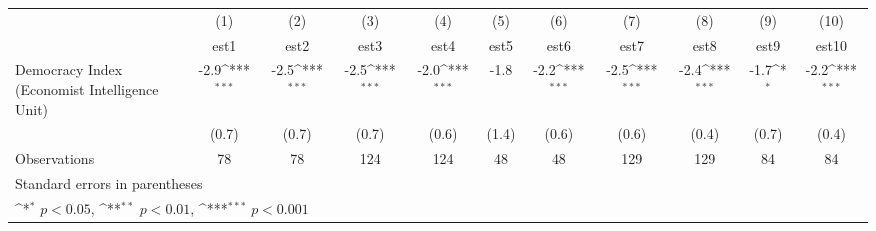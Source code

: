 {
\def\sym#1{\ifmmode^{#1}\else\(^{#1}\)\fi}
\begin{tabular}{l*{10}{c}}
\hline\hline
                    &\multicolumn{1}{c}{(1)}         &\multicolumn{1}{c}{(2)}         &\multicolumn{1}{c}{(3)}         &\multicolumn{1}{c}{(4)}         &\multicolumn{1}{c}{(5)}         &\multicolumn{1}{c}{(6)}         &\multicolumn{1}{c}{(7)}         &\multicolumn{1}{c}{(8)}         &\multicolumn{1}{c}{(9)}         &\multicolumn{1}{c}{(10)}         \\
                    &        est1         &        est2         &        est3         &        est4         &        est5         &        est6         &        est7         &        est8         &        est9         &       est10         \\
\hline
Democracy Index (Economist Intelligence Unit)&        -2.9\sym{***}&        -2.5\sym{***}&        -2.5\sym{***}&        -2.0\sym{***}&        -1.8         &        -2.2\sym{***}&        -2.5\sym{***}&        -2.4\sym{***}&        -1.7\sym{*}  &        -2.2\sym{***}\\
                    &       (0.7)         &       (0.7)         &       (0.7)         &       (0.6)         &       (1.4)         &       (0.6)         &       (0.6)         &       (0.4)         &       (0.7)         &       (0.4)         \\
\hline
Observations        &          78         &          78         &         124         &         124         &          48         &          48         &         129         &         129         &          84         &          84         \\
\hline\hline
\multicolumn{11}{l}{\footnotesize Standard errors in parentheses}\\
\multicolumn{11}{l}{\footnotesize \sym{*} \(p<0.05\), \sym{**} \(p<0.01\), \sym{***} \(p<0.001\)}\\
\end{tabular}
}
